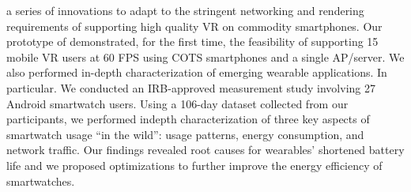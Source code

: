  a series of innovations to adapt to the stringent networking and rendering requirements of supporting high quality VR on commodity smartphones. Our prototype of \firefly demonstrated, for
 the first time, the feasibility of supporting 15 mobile VR users
 at 60 FPS using COTS smartphones and a single AP/server.
 We also performed in-depth characterization of emerging wearable applications. In particular. We conducted an IRB-approved
 measurement study involving 27 Android smartwatch users. Using
 a 106-day dataset collected from our participants, we performed indepth
 characterization of three key aspects of smartwatch usage “in
 the wild”: usage patterns, energy consumption, and network traffic.
 Our findings revealed root causes for wearables' shortened battery life and we proposed optimizations to further improve the energy efficiency of smartwatches. 
\label{Abstract}
